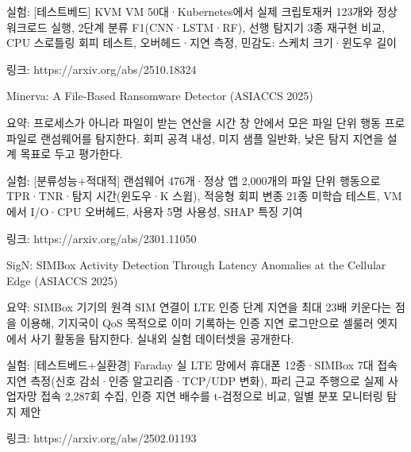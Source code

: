 \par\noindent \textbullet\enspace 실험: [테스트베드] KVM VM 50대·Kubernetes에서 실제 크립토재커 123개와 정상 워크로드 실행, 2단계 분류 F1(CNN·LSTM·RF), 선행 탐지기 3종 재구현 비교, CPU 스로틀링 회피 테스트, 오버헤드·지연 측정, 민감도: 스케치 크기·윈도우 길이


\par\noindent \textbullet\enspace 링크: https:/\allowbreak{}/\allowbreak{}arxiv.org/\allowbreak{}abs/\allowbreak{}2510.18324



\par\noindent \textbullet\enspace Minerva: A File-Based Ransomware Detector (ASIACCS 2025)

\par\noindent \textbullet\enspace 요약: 프로세스가 아니라 파일이 받는 연산을 시간 창 안에서 모은 파일 단위 행동 프로파일로 랜섬웨어를 탐지한다. 회피 공격 내성, 미지 샘플 일반화, 낮은 탐지 지연을 설계 목표로 두고 평가한다.


\par\noindent \textbullet\enspace 실험: [분류성능+\allowbreak{}적대적] 랜섬웨어 476개·정상 앱 2,000개의 파일 단위 행동으로 TPR·TNR·탐지 시간(윈도우·K 스윕), 적응형 회피 변종 21종 미학습 테스트, VM에서 I/\allowbreak{}O·CPU 오버헤드, 사용자 5명 사용성, SHAP 특징 기여


\par\noindent \textbullet\enspace 링크: https:/\allowbreak{}/\allowbreak{}arxiv.org/\allowbreak{}abs/\allowbreak{}2301.11050



\par\noindent \textbullet\enspace SigN: SIMBox Activity Detection Through Latency Anomalies at the Cellular Edge (ASIACCS 2025)

\par\noindent \textbullet\enspace 요약: SIMBox 기기의 원격 SIM 연결이 LTE 인증 단계 지연을 최대 23배 키운다는 점을 이용해, 기지국이 QoS 목적으로 이미 기록하는 인증 지연 로그만으로 셀룰러 엣지에서 사기 활동을 탐지한다. 실내외 실험 데이터셋을 공개한다.


\par\noindent \textbullet\enspace 실험: [테스트베드+\allowbreak{}실환경] Faraday 실 LTE 망에서 휴대폰 12종·SIMBox 7대 접속 지연 측정(신호 감쇠·인증 알고리즘·TCP/\allowbreak{}UDP 변화), 파리 근교 주행으로 실제 사업자망 접속 2,287회 수집, 인증 지연 배수를 t-검정으로 비교, 일별 분포 모니터링 탐지 제안


\par\noindent \textbullet\enspace 링크: https:/\allowbreak{}/\allowbreak{}arxiv.org/\allowbreak{}abs/\allowbreak{}2502.01193




